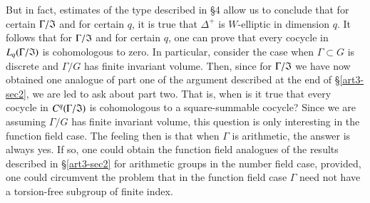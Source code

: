 But in fact, estimates of the type described in \S4 allow us to conclude that for certain $\Gamma/ \mathfrak{I}$ and for certain $q$, it is true that $\Delta^+$ is $W$-elliptic in dimension $q$. It follows that for $\Gamma/\mathfrak{I}$ and for certain $q$, one can prove that every cocycle in $L_q (\Gamma/\mathfrak{I})$ is cohomologous to zero. In particular, consider the case when $\Gamma \subset G$ is discrete and $\Gamma / G$ has finite invariant volume. Then, since for $\Gamma / \mathfrak{I}$ we have now obtained one analogue of part one of the argument described at the end of \S\ref{art3-sec2}, we are led to ask about part two. That is, when is it true that every cocycle in $C^q (\Gamma/ \mathfrak{I})$ is cohomologous to a square-summable cocycle? Since we are assuming $\Gamma/ G$ has finite invariant volume, this question is only interesting in the function field case. The feeling then is that when $\Gamma$ is arithmetic, the answer is always yes. If so, one could obtain the function field analogues of the results described in \S\ref{art3-sec2} for arithmetic groups in the number field case, provided, one could circumvent the problem that in the function field case $\Gamma$ need not have a torsion-free subgroup of finite index.

